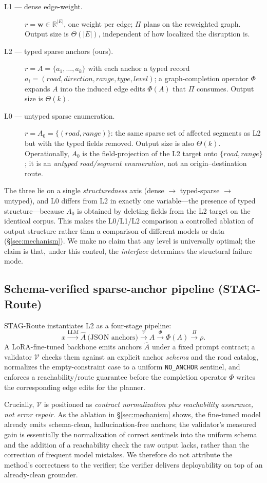 \begin{description}
  \item[L1 — dense edge-weight.] $r = \mathbf{w}\in\mathbb{R}^{|E|}$, one weight per edge; $\Pi$ plans
        on the reweighted graph. Output size is $\Theta(|E|)$, independent of how localized the
        disruption is.
  \item[L2 — typed sparse anchors (ours).] $r = A=\{a_1,\dots,a_k\}$ with each anchor a typed record
        $a_i=(\textit{road},\textit{direction},\textit{range},\textit{type},\textit{level})$; a
        graph-completion operator $\Phi$ expands $A$ into the induced edge edits $\Phi(A)$ that $\Pi$
        consumes. Output size is $\Theta(k)$.
  \item[L0 — untyped sparse enumeration.] $r = A_0=\{(\textit{road},\textit{range})\}$: the same sparse
        set of affected segments as L2 but with the typed fields removed. Output size is also
        $\Theta(k)$. Operationally, $A_0$ is the field-projection of the L2 target onto
        $\{\textit{road},\textit{range}\}$; it is an \emph{untyped road/segment enumeration}, not an
        origin--destination route.
\end{description}

The three lie on a single \emph{structuredness} axis (dense $\to$ typed-sparse $\to$ untyped), and L0
differs from L2 in exactly one variable---the presence of typed structure---because $A_0$ is obtained by
deleting fields from the L2 target on the identical corpus. This makes the L0/L1/L2 comparison a
controlled ablation of output structure rather than a comparison of different models or data
(\S\ref{sec:mechanism}). We make no claim that any level is universally optimal; the claim is that, under
this control, the \emph{interface} determines the structural failure mode.

\subsection{Schema-verified sparse-anchor pipeline (STAG-Route)}
STAG-Route instantiates L2 as a four-stage pipeline:
\[
  x \xrightarrow{\text{LLM}} \hat{A}\ \text{(JSON anchors)} \xrightarrow{\ \mathcal{V}\ } A
  \xrightarrow{\ \Phi\ } \Phi(A) \xrightarrow{\ \Pi\ } \rho .
\]
A LoRA-fine-tuned backbone emits anchors $\hat{A}$ under a fixed prompt contract; a validator
$\mathcal{V}$ checks them against an explicit anchor \emph{schema} and the road catalog, normalizes the
empty-constraint case to a uniform \texttt{NO\_ANCHOR} sentinel, and enforces a reachability/route
guarantee before the completion operator $\Phi$ writes the corresponding edge edits for the planner.

Crucially, $\mathcal{V}$ is positioned as \emph{contract normalization plus reachability assurance, not
error repair}. As the ablation in \S\ref{sec:mechanism} shows, the fine-tuned model already emits
schema-clean, hallucination-free anchors; the validator's measured gain is essentially the
normalization of correct sentinels into the uniform schema and the addition of a reachability check the
raw output lacks, rather than the correction of frequent model mistakes. We therefore do not attribute
the method's correctness to the verifier; the verifier delivers deployability on top of an already-clean
grounder.
